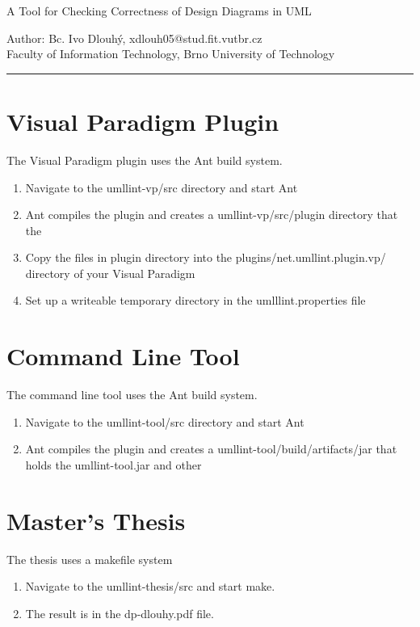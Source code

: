 \begin{center}
\LARGE{A Tool for Checking Correctness of Design Diagrams in UML}
\end{center}

\vspace{10pt}

\noindent
Author: Bc. Ivo Dlouhý, xdlouh05@stud.fit.vutbr.cz \\
Faculty of Information Technology, Brno University of Technology \\

\noindent\rule{16cm}{0.4pt}

\vspace{7pt}

\section{Visual Paradigm Plugin}
The Visual Paradigm plugin uses the Ant build system.
\begin{enumerate}
  \item Navigate to the umllint-vp/src directory and start Ant
  \item Ant compiles the plugin and creates a umllint-vp/src/plugin directory that the 
  \item Copy the files in plugin directory into the plugins/net.umllint.plugin.vp/ directory of your Visual Paradigm
  \item Set up a writeable temporary directory in the umlllint.properties file
\end{enumerate}

\section{Command Line Tool}
The command line tool uses the Ant build system.
\begin{enumerate}
  \item Navigate to the umllint-tool/src directory and start Ant
  \item Ant compiles the plugin and creates a umllint-tool/build/artifacts/jar that holds the umllint-tool.jar and other
\end{enumerate}

\section{Master's Thesis}
The thesis uses a makefile system
\begin{enumerate}
  \item Navigate to the umllint-thesis/src and start make.
  \item The result is in the dp-dlouhy.pdf file.
\end{enumerate}

